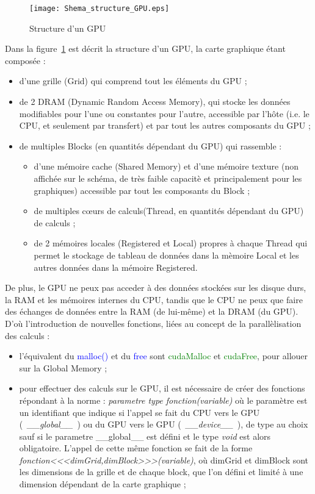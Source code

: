 \documentclass[a4paper,12pt]{article}
\begin{document}
{	\begin{figure}
	    \centering
	    \caption{Structure d'un GPU}
	    \label{fig:structGPU}
	    \texttt{[image: Shema\_structure\_GPU.eps]}
	\end{figure}
    Dans la figure~\ref{fig:structGPU} est décrit la structure d'un GPU, la carte graphique \'e{}tant compos\'e{}e :
    \begin{itemize}
        \item d'une grille (Grid) qui comprend tout les \'e{}l\'e{}ments du GPU ;
        \item de 2 DRAM (Dynamic Random Access Memory), qui stocke les donn\'e{}es modifiables pour l'une ou constantes pour l'autre, accessible par l'h\^ote (i.e. le CPU, et seulement par transfert) et par tout les autres composants du GPU ;
        \item de multiples Blocks (en quantit\'e{}s d\'e{}pendant du GPU) qui rassemble :
        \begin{itemize}[label=$+$]
            \item d'une m\'e{}moire cache (Shared Memory) et d'une m\'e{}moire texture (non affich\'e{}e sur le sch\'e{}ma, de tr\`es faible capacit\`e et principalement pour les graphiques) accessible par tout les composants du Block ;
            \item de multiples c\oe{}urs de calculs(Thread, en quantit\'e{}s d\'e{}pendant du GPU) de calculs ;
            \item de 2 m\'e{}moires locales (Registered et Local) propres \`a chaque Thread qui permet le stockage de tableau de donn\'e{}es dans la m\`emoire Local et les autres donn\'e{}es dans la m\'e{}moire Registered.
        \end{itemize}
    \end{itemize}
    De plus, le GPU ne peux pas acceder \`a des donn\'e{}es stock\'e{}es sur les disque durs, la RAM et les m\'e{}moires internes du CPU, tandis que le CPU ne peux que faire des \'e{}changes de donn\'e{}es entre la RAM (de lui-m\^eme) et la DRAM (du GPU). \\
    D'o\`u l'introduction de nouvelles fonctions, li\'e{}es au concept de la parall\`elisation des calculs :
    \begin{itemize}
        \item l'\'e{}quivalent du \textcolor{blue}{malloc()} et du \textcolor{blue}{free} sont \textcolor{green}{cudaMalloc} et \textcolor{green}{cudaFree}, pour allouer sur la Global Memory ;
        \item pour effectuer des calculs sur le GPU, il est n\'e{}cessaire de cr\'e{}er des fonctions r\'e{}pondant \`a la norme : \textit{parametre type fonction(variable)} o\`u le param\`etre est un identifiant que indique si l'appel se fait du CPU vers le GPU (~\textit{\_\_global\_\_}~) ou du GPU vers le GPU (~\textit{\_\_device\_\_}~), de type au choix sauf si le parametre \_\_global\_\_ est d\'e{}fini et le type \textit{void} est alors obligatoire. L'appel de cette m\^eme fonction se fait de la forme \textit{fonction<{}<{}<dimGrid,dimBlock>{}>{}>(variable)}, o\`u dimGrid et dimBlock sont les dimensions de la grille et de chaque block, que l'on défini et limit\'e \`a une dimension d\'e{}pendant de la carte graphique ;

\end{itemize}}
\end{document}
